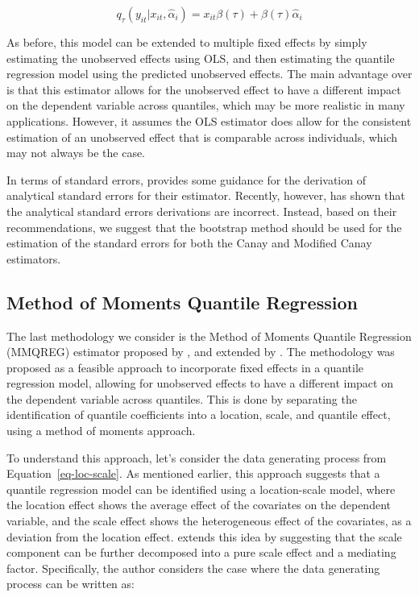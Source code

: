\documentclass[bib]{statapress}
\begin{document}
\[q_{\tau}(y_{it}|x_{it},\hat \alpha_i) =  x_{it}\beta(\tau)+\beta(\tau) \hat\alpha_i
\]

As before, this model can be extended to multiple fixed effects by
simply estimating the unobserved effects using OLS, and then estimating
the quantile regression model using the predicted unobserved effects.
The main advantage over \citet{canay2011} is that this estimator allows
for the unobserved effect to have a different impact on the dependent
variable across quantiles, which may be more realistic in many
applications. However, it assumes the OLS estimator does allow for the
consistent estimation of an unobserved effect that is comparable across
individuals, which may not always be the case.

In terms of standard errors, \citet{canay2011} provides some guidance
for the derivation of analytical standard errors for their estimator.
Recently, however, \citet{besstremyannaya2019} has shown that the
analytical standard errors derivations are incorrect. Instead, based on
their recommendations, we suggest that the bootstrap method should be
used for the estimation of the standard errors for both the Canay and
Modified Canay estimators.

\subsection{\texorpdfstring{Method of Moments Quantile Regression
\citet{mss2019}}{Method of Moments Quantile Regression @mss2019}}\label{sec-mmqr}

The last methodology we consider is the Method of Moments Quantile
Regression (MMQREG) estimator proposed by \citet{mss2019}, and extended
by \citet{riosavila2024}. The methodology was proposed as a feasible
approach to incorporate fixed effects in a quantile regression model,
allowing for unobserved effects to have a different impact on the
dependent variable across quantiles. This is done by separating the
identification of quantile coefficients into a location, scale, and
quantile effect, using a method of moments approach.

To understand this approach, let's consider the data generating process
from Equation~\ref{eq-loc-scale}. As mentioned earlier, this approach
suggests that a quantile regression model can be identified using a
location-scale model, where the location effect shows the average effect
of the covariates on the dependent variable, and the scale effect shows
the heterogeneous effect of the covariates, as a deviation from the
location effect. \citet{mss2019} extends this idea by suggesting that
the scale component can be further decomposed into a pure scale effect
and a mediating factor. Specifically, the author considers the case
where the data generating process can be written as:
\end{document}
